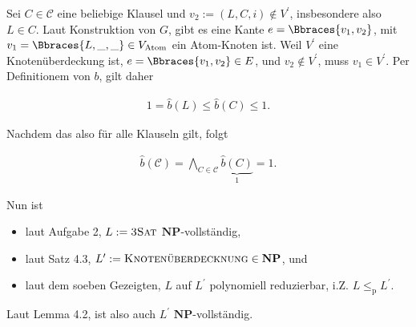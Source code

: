 \begin{solution}
Sei $C \in \mathcal C$ eine beliebige Klausel und $v_2 := (L, C, i) \not \in V^\prime$, insbesondere also $L \in C$.
Laut Konstruktion von $G$, gibt es eine Kante $e = \Bbraces{v_1, v_2}$, mit $v_1 = \Bbraces{L, \_, \_} \in V_\text{Atom}$ ein Atom-Knoten ist.
Weil $V^\prime$ eine Knotenüberdeckung ist, $e = \Bbraces{v_1, v_2} \in E$, und $v_2 \not \in V^\prime$, muss $v_1 \in V^\prime$.
Per Definitionem von $b$, gilt daher

\begin{align*}
    1 = \hat b(L) \leq \hat b(C) \leq 1.
\end{align*}

Nachdem das also für alle Klauseln gilt, folgt

\begin{align*}
    \hat b(\mathcal C)
    =
    \bigwedge_{C \in \mathcal C}
        \underbrace{\hat b(C)}_1
    =
    1.
\end{align*}

Nun ist

\begin{itemize}
    \item laut Aufgabe 2, $L := \textsc{3Sat}$ $\mathbf{NP}$-vollständig,
    \item laut Satz 4.3, $L^\prime := \textsc{Knotenüberdecknung} \in \mathbf{NP}$, und
    \item laut dem soeben Gezeigten, $L$ auf $L^\prime$ polynomiell reduzierbar, i.Z. $L \leq_\mathrm{p} L^\prime$.
\end{itemize}

Laut Lemma 4.2, ist also auch $L^\prime$ $\mathbf{NP}$-vollständig.

\end{solution}

